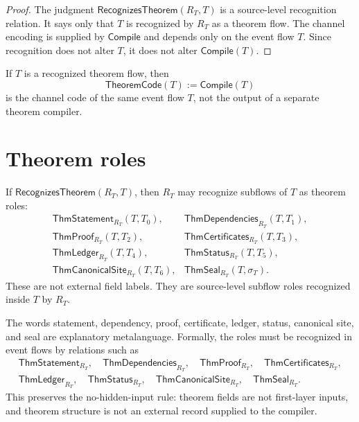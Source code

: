 \begin{proof}
The judgment $\mathsf{RecognizesTheorem}(R_T,T)$ is a source-level recognition relation. It says only that $T$ is recognized by $R_T$ as a theorem flow. The channel encoding is supplied by $\mathsf{Compile}$ and depends only on the event flow $T$. Since recognition does not alter $T$, it does not alter $\mathsf{Compile}(T)$.
\end{proof}

\begin{corollary}
\label{cor:theorem-generated-code-not-new-code}
If $T$ is a recognized theorem flow, then
$$
  \mathsf{TheoremCode}(T):=\mathsf{Compile}(T)
$$
is the channel code of the same event flow $T$, not the output of a separate theorem compiler.
\end{corollary}

\section{Theorem roles}
\label{sec:theorem-generated-roles}

\begin{definition}
\label{def:theorem-generated-subflows}
If $\mathsf{RecognizesTheorem}(R_T,T)$, then $R_T$ may recognize subflows of $T$ as theorem roles:
$$
\begin{array}{ll}
  \mathsf{ThmStatement}_{R_T}(T,T_0),&
  \mathsf{ThmDependencies}_{R_T}(T,T_1),\\
  \mathsf{ThmProof}_{R_T}(T,T_2),&
  \mathsf{ThmCertificates}_{R_T}(T,T_3),\\
  \mathsf{ThmLedger}_{R_T}(T,T_4),&
  \mathsf{ThmStatus}_{R_T}(T,T_5),\\
  \mathsf{ThmCanonicalSite}_{R_T}(T,T_6),&
  \mathsf{ThmSeal}_{R_T}(T,\sigma_T).
\end{array}
$$
These are not external field labels. They are source-level subflow roles recognized inside $T$ by $R_T$.
\end{definition}

\begin{remark}
\label{rem:theorem-generated-field-names-metalanguage}
The words statement, dependency, proof, certificate, ledger, status, canonical site, and seal are explanatory metalanguage. Formally, the roles must be recognized in event flows by relations such as
$$
\begin{gathered}
  \mathsf{ThmStatement}_{R_T},\quad
  \mathsf{ThmDependencies}_{R_T},\quad
  \mathsf{ThmProof}_{R_T},\quad
  \mathsf{ThmCertificates}_{R_T},\\
  \mathsf{ThmLedger}_{R_T},\quad
  \mathsf{ThmStatus}_{R_T},\quad
  \mathsf{ThmCanonicalSite}_{R_T},\quad
  \mathsf{ThmSeal}_{R_T}.
\end{gathered}
$$
This preserves the no-hidden-input rule: theorem fields are not first-layer inputs, and theorem structure is not an external record supplied to the compiler.
\end{remark}

